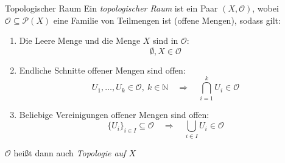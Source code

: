 \begin{definition}{Topologischer Raum}
    Ein \emph{topologischer Raum} ist ein Paar $(X, \mathcal{O})$, wobei $\mathcal{O} \subseteq \mathcal{P}(X)$ eine Familie von Teilmengen ist (offene Mengen), sodass gilt:
    
    \begin{enumerate}
        \item Die Leere Menge und die Menge $X$ sind in $\mathcal{O}$: \\
        $$\emptyset, X \in \mathcal{O}$$
        \item Endliche Schnitte offener Mengen sind offen:
        $$
            U_1, \dots, U_k \in \mathcal{O},\ k \in \mathbb{N} \quad \Rightarrow \quad \bigcap_{i=1}^k U_i \in \mathcal{O}
        $$
        \item Beliebige Vereinigungen offener Mengen sind offen:
        $$
            \{ U_i \}_{i \in I} \subseteq \mathcal{O} \quad \Rightarrow \quad \bigcup_{i \in I} U_i \in \mathcal{O}
        $$
    \end{enumerate}
    
    $\mathcal{O}$ heißt dann auch \emph{Topologie auf $X$}
\end{definition}